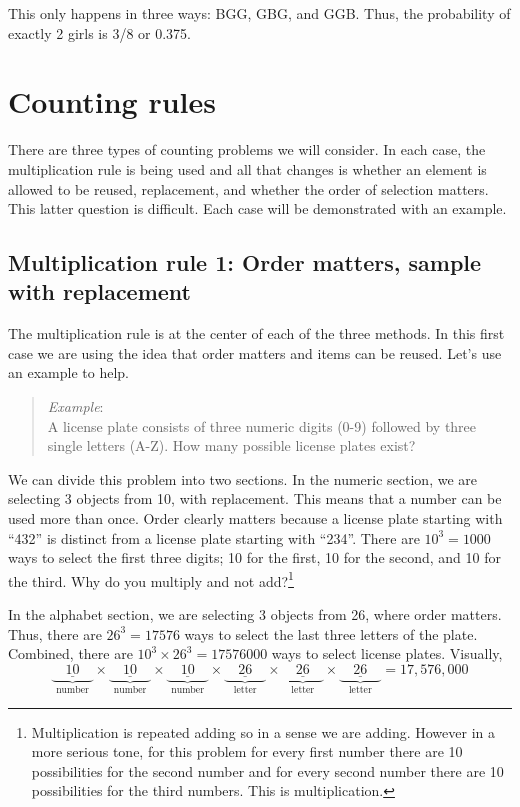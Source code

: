 \documentclass[
  letterpaper,
  DIV=11,
  numbers=noendperiod]{scrreprt}
\begin{document}
This only happens in three ways: BGG, GBG, and GGB. Thus, the
probability of exactly 2 girls is 3/8 or 0.375.

\section{Counting rules}\label{counting-rules}

There are three types of counting problems we will consider. In each
case, the multiplication rule is being used and all that changes is
whether an element is allowed to be reused, replacement, and whether the
order of selection matters. This latter question is difficult. Each case
will be demonstrated with an example.

\subsection{Multiplication rule 1: Order matters, sample with
replacement}\label{multiplication-rule-1-order-matters-sample-with-replacement}

The multiplication rule is at the center of each of the three methods.
In this first case we are using the idea that order matters and items
can be reused. Let's use an example to help.

\begin{quote}
\emph{Example}:\\
A license plate consists of three numeric digits (0-9) followed by three
single letters (A-Z). How many possible license plates exist?
\end{quote}

We can divide this problem into two sections. In the numeric section, we
are selecting 3 objects from 10, with replacement. This means that a
number can be used more than once. Order clearly matters because a
license plate starting with ``432'' is distinct from a license plate
starting with ``234''. There are \(10^3 = 1000\) ways to select the
first three digits; 10 for the first, 10 for the second, and 10 for the
third. Why do you multiply and not add?\footnote{Multiplication is
  repeated adding so in a sense we are adding. However in a more serious
  tone, for this problem for every first number there are 10
  possibilities for the second number and for every second number there
  are 10 possibilities for the third numbers. This is multiplication.}

In the alphabet section, we are selecting 3 objects from 26, where order
matters. Thus, there are \(26^3=17576\) ways to select the last three
letters of the plate. Combined, there are
\(10^3 \times 26^3 = 17576000\) ways to select license plates. Visually,
\[
\underbrace{\underline{\quad 10 \quad }}_\text{number} \times \underbrace{\underline{\quad 10 \quad }}_\text{number} \times \underbrace{\underline{\quad 10 \quad }}_\text{number} \times \underbrace{\underline{\quad 26 \quad }}_\text{letter} \times \underbrace{\underline{\quad 26 \quad }}_\text{letter} \times \underbrace{\underline{\quad 26 \quad }}_\text{letter} = 17,576,000
\]
\end{document}

